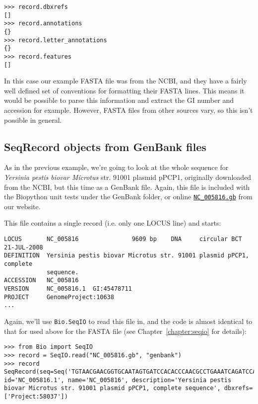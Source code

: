 \begin{verbatim}
>>> record.dbxrefs
[]
>>> record.annotations
{}
>>> record.letter_annotations
{}
>>> record.features
[]
\end{verbatim}

In this case our example FASTA file was from the NCBI, and they have a fairly well defined set of conventions for formatting their FASTA lines. This means it would be possible to parse this information and extract the GI number and accession for example. However, FASTA files from other sources vary, so this isn't possible in general.

\subsection{SeqRecord objects from GenBank files}

As in the previous example, we're going to look at the whole sequence for \textit{Yersinia pestis biovar Microtus} str. 91001 plasmid pPCP1, originally downloaded from the NCBI, but this time as a GenBank file.
Again, this file is included with the Biopython unit tests under the GenBank folder, or online \href{https://raw.githubusercontent.com/biopython/biopython/master/Tests/GenBank/NC_005816.gb}{\texttt{NC\_005816.gb}} from our website.

This file contains a single record (i.e. only one LOCUS line) and starts:

\begin{verbatim}
LOCUS       NC_005816               9609 bp    DNA     circular BCT 21-JUL-2008
DEFINITION  Yersinia pestis biovar Microtus str. 91001 plasmid pPCP1, complete
            sequence.
ACCESSION   NC_005816
VERSION     NC_005816.1  GI:45478711
PROJECT     GenomeProject:10638
...
\end{verbatim}

Again, we'll use \verb|Bio.SeqIO| to read this file in, and the code is almost identical to that for used above for the FASTA file (see Chapter~\ref{chapter:seqio} for details):

\begin{verbatim}
>>> from Bio import SeqIO
>>> record = SeqIO.read("NC_005816.gb", "genbank")
>>> record
SeqRecord(seq=Seq('TGTAACGAACGGTGCAATAGTGATCCACACCCAACGCCTGAAATCAGATCCAGG...CTG'), id='NC_005816.1', name='NC_005816', description='Yersinia pestis biovar Microtus str. 91001 plasmid pPCP1, complete sequence', dbxrefs=['Project:58037'])
\end{verbatim}


